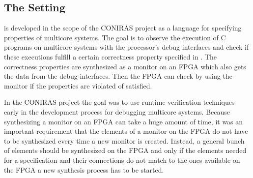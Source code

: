 



\subsection{The Setting}

\tessla is developed in the scope of the CONIRAS project as a language for specifying properties of multicore systems. The goal is to observe the execution of C programs on multicore systems with the processor's debug interfaces and check if these executions fulfill a certain correctness property specified in \tessla. The correctness properties are synthesized as a monitor on an FPGA which also gets the data from the debug interfaces. Then the FPGA can check by using the monitor if the properties are violated of satisfied.

In the CONIRAS project the goal was to use runtime verification techniques early in the development process for debugging multicore systems. Because synthesizing a monitor on an FPGA can take a huge amount of time, it was an important requirement that the elements of a monitor on the FPGA do not have to be synthesized every time a new monitor is created. Instead, a general bunch of elements should be synthesized on the FPGA and only if the elements needed for a \tessla specification and their connections do not match to the ones available on the FPGA a new synthesis process has to be started.

